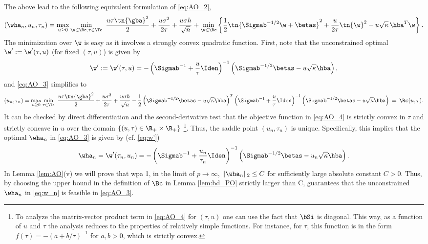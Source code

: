 The above lead to the following equivalent formulation of \eqref{eq:AO_2}, 
\begin{align}
\left(\wha_n,u_n,\tau_n\right) = \max_{u\geq 0}\min_{\w\in\Bc,\tau\in\Tc} ~ \frac{u\tau\tn{\gba}^2}{2} + \frac{u\sigma^2}{2\tau} + \frac{u\sigma h}{\sqrt{n}} + \min_{\w\in\Bc} \left\{ \frac{1}{2}\tn{\Sigmab^{-1/2}\w+\betas}^2 + \frac{u}{2\tau}\tn{\w}^2 - u \sqrt{\kappa}\,{\hba}^T\w \right\} .\label{eq:AO_3}
\end{align}
The minimization over $\w$ is easy as it involves a strongly convex quadratic function. First, note that the unconstrained optimal $\w':=\w'(\tau,u)$ (for fixed $(\tau,u)$) is given by
\begin{align}\label{eq:w'}
\w':=\w'(\tau,u) = -\left(\Sigmab^{-1}+\frac{u}{\tau}\Iden\right)^{-1}\left(\Sigmab^{-1/2}\betas-u\sqrt{\kappa}\hba\right), 
\end{align}
and \eqref{eq:AO_3} simplifies to
\begin{align}
\left(u_n,\tau_n\right)=\max_{u\geq 0}\min_{\tau\in\Tc} ~ \frac{u\tau\tn{\gba}^2}{2} + \frac{u\sigma^2}{2\tau} + \frac{u\sigma h}{\sqrt{n}} - \frac{1}{2} \left(\Sigmab^{-1/2}\betas-u\sqrt{\kappa}\hba\right)^T\left(\Sigmab^{-1}+\frac{u}{\tau}\Iden\right)^{-1} \left(\Sigmab^{-1/2}\betas-u\sqrt{\kappa}\hba\right)\,=:\Rc(u,\tau) .\label{eq:AO_4}
\end{align}
It can be checked by direct differentiation and the second-derivative test that the objective function in \eqref{eq:AO_4} is strictly convex in $\tau$ and strictly concave in $u$ over the domain $\{(u,\tau)\in\R_+\times\R_+\}$ \footnote{{To analyze the matrix-vector product term in \eqref{eq:AO_4} for $(\tau,u)$ one can use the fact that $\bSi$ is diagonal. This way, as a function of $u$ and $\tau$ the analysis reduces to the properties of relatively simple functions. For instance, for $\tau$, this function is in the form $f(\tau)=-(a+b/\tau)^{-1}$ for $a,b>0$, which is strictly convex.}}. Thus, the saddle point $(u_n,\tau_n)$ is unique. Specifically, this implies that the optimal $\wha_n$ in \eqref{eq:AO_3} is given by (cf. \eqref{eq:w'})
\begin{align}\label{eq:w_n}
\wha_n=\w'(\tau_n,u_n) = -\left(\Sigmab^{-1}+\frac{u_n}{\tau_n}\Iden\right)^{-1}\left(\Sigmab^{-1/2}\betas-u_n\sqrt{\kappa}\hba\right).
\end{align}
In Lemma \ref{lem:AO}(v) we will prove that wpa 1, in the limit of $p\rightarrow\infty$, $\|\wha_n\|_2\leq C$ for sufficiently large absolute constant $C>0$. Thus, by choosing the upper bound in the definition of $\Bc$ in Lemma \ref{lem:bd_PO} strictly larger than C, guarantees that the unconstrained $\wha_n$ in \eqref{eq:w_n} is feasible in \eqref{eq:AO_3}.


